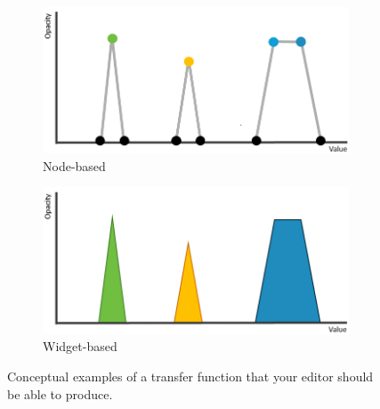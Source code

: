 \documentclass{labinstructions}
\begin{document}
\begin{figure}
\centering
\begin{subfigure}{.5\textwidth}
  \centering
  \includegraphics[width=.7\linewidth]{images/TF_node.png}
  \caption{Node-based}
  \label{fig:sub1}
\end{subfigure}%
\begin{subfigure}{.5\textwidth}
  \centering
  \includegraphics[width=.7\linewidth]{images/TF_widget.png}
  \caption{Widget-based}
  \label{fig:sub2}
\end{subfigure}
\caption{Conceptual examples of a transfer function that your editor should be able to produce.}
\label{fig:tf-examples}
\end{figure}
\end{document}
